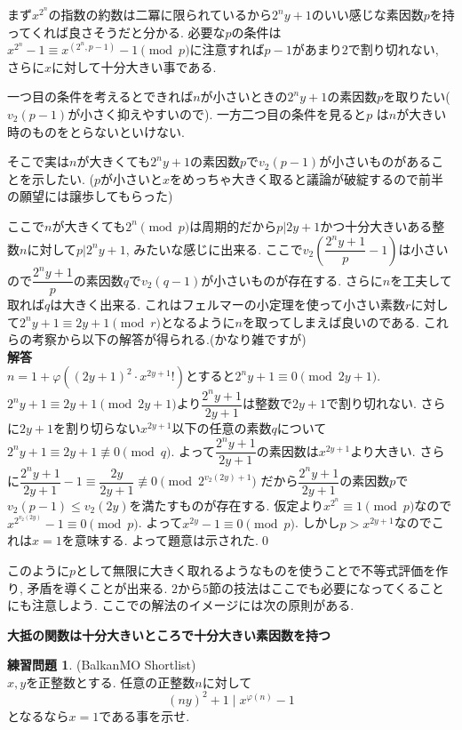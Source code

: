 \documentclass{ltjsarticle}
\theoremstyle{definition}
\newtheorem{prob}{練習問題}
\begin{document}
まず$x^{2^n}$の指数の約数は二冪に限られているから$2^ny+1$のいい感じな素因数$p$を持ってくれば良さそうだと分かる. 必要な$p$の条件は$x^{2^n}-1\equiv x^{(2^n,p-1)}-1\pmod p$に注意すれば$p-1$があまり$2$で割り切れない, さらに$x$に対して十分大きい事である.

一つ目の条件を考えるとできれば$n$が小さいときの$2^ny+1$の素因数$p$を取りたい($v_2(p-1)$が小さく抑えやすいので). 一方二つ目の条件を見ると$p$ は$n$が大きい時のものをとらないといけない.

そこで実は$n$が大きくても$2^ny+1$の素因数$p$で$v_2(p-1)$が小さいものがあることを示したい. ($p$が小さいと$x$をめっちゃ大きく取ると議論が破綻するので前半の願望には譲歩してもらった)

ここで$n$が大きくても$2^n\pmod p$は周期的だから$p|2y+1$かつ十分大きいある整数$n$に対して$p|2^ny+1$, みたいな感じに出来る. ここで$v_2(\dfrac{2^ny+1}p-1)$は小さいので$\dfrac{2^ny+1}p$の素因数$q$で$v_2(q-1)$が小さいものが存在する. さらに$n$を工夫して取れば$q$は大きく出来る. これはフェルマーの小定理を使って小さい素数$r$に対して$2^ny+1\equiv 2y+1\pmod r$となるように$n$を取ってしまえば良いのである. これらの考察から以下の解答が得られる.(かなり雑ですが)\\
\textbf{解答}\\
$n=1+\varphi((2y+1)^2\cdot x^{2y+1}!)$とすると$2^ny+1\equiv0\pmod{2y+1}$. $2^ny+1\equiv2y+1\pmod{2y+1}$より$\dfrac{2^ny+1}{2y+1}$は整数で$2y+1$で割り切れない. さらに$2y+1$を割り切らない$x^{2y+1}$以下の任意の素数$q$について$2^ny+1\equiv2y+1\not\equiv0\pmod q$. よって$\dfrac{2^ny+1}{2y+1}$の素因数は$x^{2y+1}$より大きい. さらに$\dfrac{2^ny+1}{2y+1}-1\equiv \dfrac{2y}{2y+1}\not\equiv0\pmod{2^{v_2(2y)+1}}$ だから$\dfrac{2^ny+1}{2y+1}$の素因数$p$で$v_2(p-1)\leq v_2(2y)$を満たすものが存在する. 仮定より$x^{2^n}\equiv1\pmod p$なので$x^{2^{v_2(2y)}}-1\equiv0\pmod p$. よって$x^{2y}-1\equiv0\pmod p$. しかし$p>x^{2y+1}$なのでこれは$x=1$を意味する. よって題意は示された.\qed

このように$p$として無限に大きく取れるようなものを使うことで不等式評価を作り, 矛盾を導くことが出来る. $2$から$5$節の技法はここでも必要になってくることにも注意しよう. ここでの解法のイメージには次の原則がある.

\begin{center}
    \textbf{大抵の関数は十分大きいところで十分大きい素因数を持つ}
\end{center}

\begin{prob}(BalkanMO Shortlist)\\
$x,y$を正整数とする. 任意の正整数$n$に対して
$$(ny)^2+1\mid x^{\varphi(n)}-1$$
となるなら$x=1$である事を示せ.
\end{prob}
\end{document}
